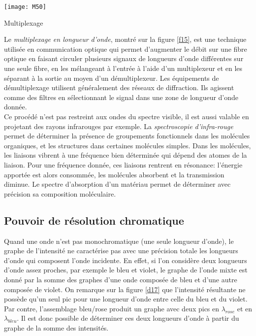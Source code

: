 \begin{marginfigure}[-1cm]
\texttt{[image: M50]}
\caption{Multiplexage}
\label{f15}
\end{marginfigure}

\noindent Le \textit{multiplexage en longueur d'onde}, montré sur la figure \ref{f15}, est une technique utilisée en communication optique qui permet d'augmenter le débit sur une fibre optique en faisant circuler plusieurs signaux de longueurs d'onde différentes sur une seule fibre, en les mélangeant à l'entrée à l'aide d'un multiplexeur et en les séparant à la sortie au moyen d'un démultiplexeur. Les équipements de démultiplexage utilisent généralement des réseaux de diffraction. Ils agissent comme des filtres en sélectionnant le signal dans une zone de longueur d'onde donnée.\\

\noindent Ce procédé n'est pas restreint aux ondes du spectre visible, il est aussi valable en projetant des rayons infrarouges par exemple. La \textit{spectroscopie d'infra-rouge} permet de déterminer la présence de groupements fonctionnels dans les molécules organiques, et les structures dans certaines molécules simples. Dans les molécules, les liaisons vibrent à une fréquence bien déterminée qui dépend des atomes de la liaison. Pour une fréquence donnée, ces liaisons rentrent en résonance: l'énergie apportée est alors consommée, les molécules absorbent et la transmission diminue. Le spectre d'absorption d'un matériau permet de déterminer avec précision sa composition moléculaire.

\subsection{Pouvoir de résolution chromatique}

Quand une onde n'est pas monochromatique (une seule longueur d'onde), le graphe de l'intensité ne caractérise pas avec une précision totale les longueurs d'onde qui composent l'onde incidente. En effet, si l'on considère deux longueurs d'onde assez proches, par exemple le bleu et violet, le graphe de l'onde mixte est donné par la somme des graphes d'une onde composée de bleu et d'une autre composée de violet. On remarque sur la figure \ref{d17} que l'intensité résultante ne possède qu'un seul pic pour une longueur d'onde entre celle du bleu et du violet. Par contre, l'assemblage bleu/rose produit un graphe avec deux pics en $\lambda_{rose}$ et en $\lambda_{bleu}$. Il est donc possible de déterminer ces deux longueurs d'onde à partir du graphe de la somme des intensités.\\

